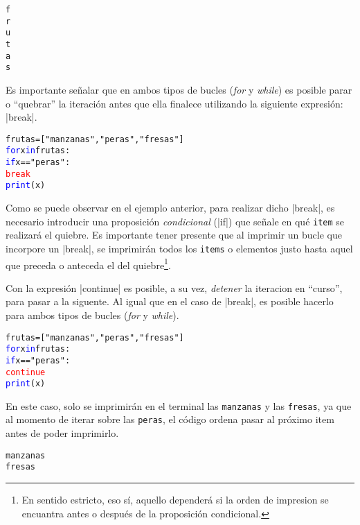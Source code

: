 \documentclass{article}
\begin{document}
\begin{enumerate}
\begin{itemize}
\begin{tcolorbox}
\begin{alltt}
f
r
u
t
a
s
\end{alltt}        
\end{tcolorbox}
\vspace{0.25cm}
\end{itemize}
\par \hspace{5pt} Es importante señalar que en ambos tipos de bucles (\emph{for} y \emph{while}) es posible parar o ``quebrar'' la iteración antes que ella finalece utilizando la siguiente expresión: \rverb|break|.
\begin{tcolorbox}
\begin{alltt}
frutas = ["manzanas", "peras", "fresas"]
\textcolor{blue}{for} x \textcolor{blue}{in} frutas:
  \textcolor{blue}{if} x == "peras":
    \textcolor{red}{break}
  \textcolor{blue}{print}(x) 
\end{alltt}        
\end{tcolorbox}
\par \hspace{5pt} Como se puede observar en el ejemplo anterior, para realizar dicho \rverb|break|, es necesario introducir una proposición \emph{condicional} (\bverb|if|) que señale en qué \verb|item| se realizará el quiebre. Es importante tener presente que al imprimir un bucle que incorpore un \rverb|break|, se imprimirán todos los \verb|items| o elementos justo hasta aquel que preceda o anteceda el del quiebre\footnote{
  En sentido estricto, eso sí, aquello dependerá si la orden de impresion se encuantra antes o después de la proposición condicional.}.
\par \hspace{5pt} Con la expresión \rverb|continue| es posible, a su vez, \emph{detener} la iteracion en ``curso'', para pasar a la siguente. Al igual que en el caso de \rverb|break|, es posible hacerlo para ambos tipos de bucles (\emph{for} y \emph{while}).
\begin{tcolorbox}
\begin{alltt}
frutas = ["manzanas", "peras", "fresas"]
\textcolor{blue}{for} x \textcolor{blue}{in} frutas:
  \textcolor{blue}{if} x == "peras":
    \textcolor{red}{continue}
  \textcolor{blue}{print}(x) 
\end{alltt}        
\end{tcolorbox}
\par \hspace{5pt} En este caso, solo se imprimirán en el terminal las \verb|manzanas| y las \verb|fresas|, ya que al momento de iterar sobre las \verb|peras|, el código ordena pasar al próximo item antes de poder imprimirlo. 
\begin{tcolorbox}
\begin{alltt}
manzanas
fresas 
\end{alltt}        
\end{tcolorbox}
\vspace{0.5cm}


\end{enumerate}
\end{document}
